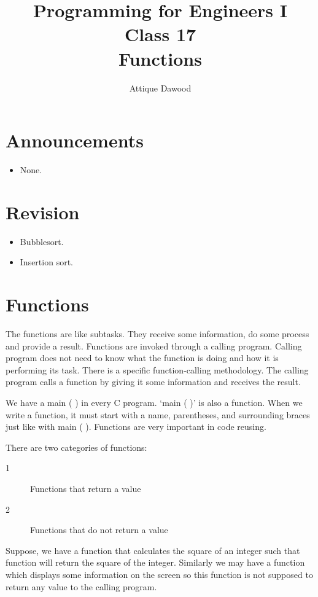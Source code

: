 \documentclass[12pt,a4paper]{article}
\title{\vspace{-2cm}Programming for Engineers I\\Class 17\\Functions}
\author{Attique Dawood}
\begin{document}
\maketitle
\section{Announcements}
\begin{itemize}
\item None.
\end{itemize}
\section{Revision}
\begin{itemize}
\item Bubblesort.
\item Insertion sort.
\end{itemize}
\section{Functions}
The functions are like subtasks. They receive some information, do some process and provide a result. Functions are invoked through a calling program. Calling program does not need to know what the function is doing and how it is performing its task. There is a specific function-calling methodology. The calling program calls a function by giving it some information and receives the result.

We have a main ( ) in every C program. ‘main ( )’ is also a function. When we write a function, it must start with a name, parentheses, and surrounding braces just like with main ( ). Functions are very important in code reusing.

There are two categories of functions:

\begin{description}
\item [1]Functions that return a value
\item [2]Functions that do not return a value
\end{description}

Suppose, we have a function that calculates the square of an integer such that function will return the square of the integer. Similarly we may have a function which displays some information on the screen so this function is not supposed to return any value to the calling program.
\end{document}
